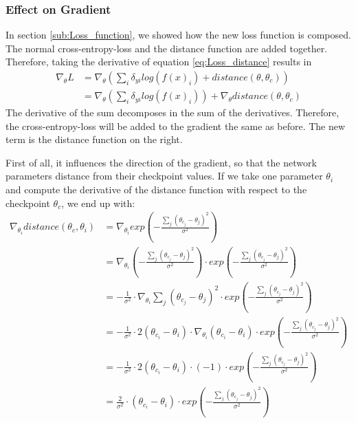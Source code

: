 \subsubsection{Effect on Gradient}\label{sub:Effect_on_Gradient} 
In section \ref{sub:Loss_function}, we showed how the new loss function is
composed. The normal cross-entropy-loss and the distance function are added
together. Therefore, taking the derivative of equation \ref{eq:Loss_distance}
results in 
\begin{align}
    \nabla_\theta L 
    &= \nabla_\theta (\sum_{i} \delta_{yi} log(f(x)_i) + distance(\theta, \theta_c))\\
    &= \nabla_\theta (\sum_{i} \delta_{yi} log(f(x)_i)) + \nabla_\theta distance(\theta, \theta_c)
\end{align}
The derivative of the sum decomposes in the sum of the derivatives. Therefore,
the cross-entropy-loss will be added to the gradient the same as before. The new
term is the distance function on the right.

First of all, it influences the direction of the gradient, so that the network
parameters distance from their checkpoint values. If we take one parameter
$\theta_i$ and compute the derivative of the distance function with respect to
the checkpoint $\theta_c$, we end up with:
\begin{align}
    \nabla_{\theta_i} distance(\theta_c, \theta_i)
    &= \nabla_{\theta_i} exp(-\frac{\sum_j (\theta_{c_j}-\theta_{j})^2}{\sigma^2}) \\
    &= \nabla_{\theta_i} (-\frac{\sum_j (\theta_{c_j}-\theta_{j})^2}{\sigma^2}) \cdot exp(-\frac{\sum_j (\theta_{c_j}-\theta_{j})^2}{\sigma^2}) \\
    &= -\frac{1}{\sigma^2} \cdot \nabla_{\theta_i} \sum_j (\theta_{c_j}-\theta_{j})^2 \cdot exp(-\frac{\sum_j (\theta_{c_j}-\theta_{j})^2}{\sigma^2}) \\
    &= -\frac{1}{\sigma^2} \cdot 2 (\theta_{c_i} - \theta_i) \cdot \nabla_{\theta_i}(\theta_{c_i} - \theta_i) \cdot exp(-\frac{\sum_j (\theta_{c_j}-\theta_{j})^2}{\sigma^2}) \\
    &= -\frac{1}{\sigma^2} \cdot 2 (\theta_{c_i} - \theta_i) \cdot (-1) \cdot exp(-\frac{\sum_j (\theta_{c_j}-\theta_{j})^2}{\sigma^2}) \\
    &= \frac{2}{\sigma^2} \cdot (\theta_{c_i} - \theta_i) \cdot exp(-\frac{\sum_j (\theta_{c_j}-\theta_{j})^2}{\sigma^2}) 
\end{align}

